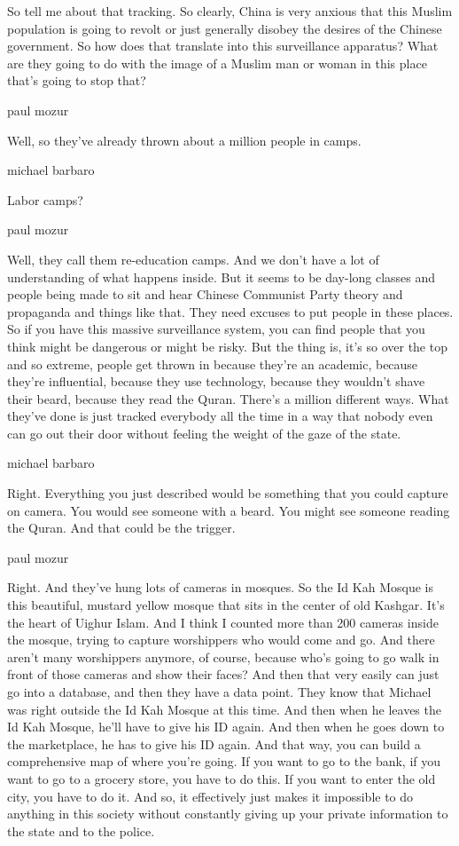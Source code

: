 So tell me about that tracking. So clearly, China is very anxious that
this Muslim population is going to revolt or just generally disobey the
desires of the Chinese government. So how does that translate into this
surveillance apparatus? What are they going to do with the image of a
Muslim man or woman in this place that's going to stop that?

paul mozur

Well, so they've already thrown about a million people in camps.

michael barbaro

Labor camps?

paul mozur

Well, they call them re-education camps. And we don't have a lot of
understanding of what happens inside. But it seems to be day-long
classes and people being made to sit and hear Chinese Communist Party
theory and propaganda and things like that. They need excuses to put
people in these places. So if you have this massive surveillance system,
you can find people that you think might be dangerous or might be risky.
But the thing is, it's so over the top and so extreme, people get thrown
in because they're an academic, because they're influential, because
they use technology, because they wouldn't shave their beard, because
they read the Quran. There's a million different ways. What they've done
is just tracked everybody all the time in a way that nobody even can go
out their door without feeling the weight of the gaze of the state.

michael barbaro

Right. Everything you just described would be something that you could
capture on camera. You would see someone with a beard. You might see
someone reading the Quran. And that could be the trigger.

paul mozur

Right. And they've hung lots of cameras in mosques. So the Id Kah Mosque
is this beautiful, mustard yellow mosque that sits in the center of old
Kashgar. It's the heart of Uighur Islam. And I think I counted more than
200 cameras inside the mosque, trying to capture worshippers who would
come and go. And there aren't many worshippers anymore, of course,
because who's going to go walk in front of those cameras and show their
faces? And then that very easily can just go into a database, and then
they have a data point. They know that Michael was right outside the Id
Kah Mosque at this time. And then when he leaves the Id Kah Mosque,
he'll have to give his ID again. And then when he goes down to the
marketplace, he has to give his ID again. And that way, you can build a
comprehensive map of where you're going. If you want to go to the bank,
if you want to go to a grocery store, you have to do this. If you want
to enter the old city, you have to do it. And so, it effectively just
makes it impossible to do anything in this society without constantly
giving up your private information to the state and to the police.

